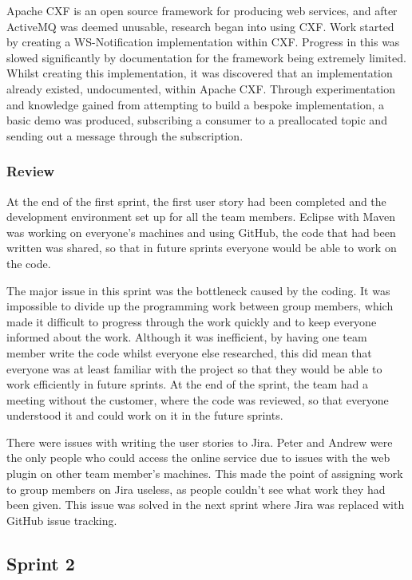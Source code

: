 \documentclass[a4paper, 12pt, twoside]{article}
\begin{document}
Apache CXF is an open source framework for producing web services, and after ActiveMQ was deemed unusable, research began into using CXF. Work started by creating a WS-Notification implementation within CXF. Progress in this was slowed significantly by documentation for the framework being extremely limited. Whilst creating this implementation, it was discovered that an implementation already existed, undocumented, within Apache CXF. Through experimentation and knowledge gained from attempting to build a bespoke implementation, a basic demo was produced, subscribing a consumer to a preallocated topic and sending out a message through the subscription.

\subsubsection{Review}

At the end of the first sprint, the first user story had been completed and the development environment set up for all the team members. Eclipse with Maven was working on everyone's machines and using GitHub, the code that had been written was shared, so that in future sprints everyone would be able to work on the code.

The major issue in this sprint was the bottleneck caused by the coding. It was impossible to divide up the programming work between group members, which made it difficult to progress through the work quickly and to keep everyone informed about the work. Although it was inefficient, by having one team member write the code whilst everyone else researched, this did mean that everyone was at least familiar with the project so that they would be able to work efficiently in future sprints. At the end of the sprint, the team had a meeting without the customer, where the code was reviewed, so that everyone understood it and could work on it in the future sprints.

There were issues with writing the user stories to Jira. Peter and Andrew were the only people who could access the online service due to issues with the web plugin on other team member's machines. This made the point of assigning work to group members on Jira useless, as people couldn't see what work they had been given. This issue was solved in the next sprint where Jira was replaced with GitHub issue tracking.

\subsection{Sprint 2}
\label{sec:impl_sprint_2}
\end{document}
